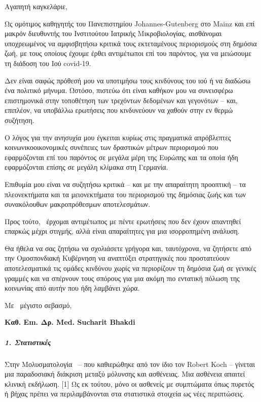 Αγαπητή καγκελάριε,

Ως ομότιμος καθηγητής του Πανεπιστημίου Johannes-Gutenberg στο Mainz και
επί μακρόν διευθυντής του Ινστιτούτου Ιατρικής Μικροβιολογίας,
αισθάνομαι υποχρεωμένος να αμφισβητήσω κριτικά τους εκτεταμένους
περιορισμούς στη δημόσια ζωή, με τους οποίους έχουμε έρθει αντιμέτωποι
επί του παρόντος, για να μειώσουμε τη διάδοση του Ιού covid-19.

Δεν είναι σαφώς πρόθεσή μου να υποτιμήσω τους κινδύνους του ιού ή να
διαδώσω ένα πολιτικό μήνυμα. Ωστόσο, πιστεύω ότι είναι καθήκον μου να
συνεισφέρω επιστημονικά στην τοποθέτηση των τρεχόντων δεδομένων και
γεγονότων -- και, επιπλέον, να υποβάλλω ερωτήσεις που κινδυνεύουν να
χαθούν στην εν θερμώ συζήτηση.

Ο λόγος για την ανησυχία μου έγκειται κυρίως στις πραγματικά απρόβλεπτες
κοινωνικοοικονομικές συνέπειες των δραστικών μέτρων περιορισμού που
εφαρμόζονται επί του παρόντος σε μεγάλα μέρη της Ευρώπης και τα οποία
ήδη εφαρμόζονται επίσης σε μεγάλη κλίμακα στη Γερμανία.

Επιθυμία μου είναι να συζητήσω κριτικά -- και με την απαραίτητη
προοπτική -- τα πλεονεκτήματα και τα μειονεκτήματα του περιορισμού της
δημόσιας ζωής και των συνακόλουθων μακροπρόθεσμων αποτελεσμάτων.

Προς τούτο,~ έρχομαι αντιμέτωπος με πέντε ερωτήσεις που δεν έχουν
απαντηθεί επαρκώς μέχρι στιγμής, αλλά είναι απαραίτητες για μια
ισορροπημένη ανάλυση.

Θα ήθελα να σας ζητήσω να σχολιάσετε γρήγορα και, ταυτόχρονα, να
ζητήσετε από την Ομοσπονδιακή Κυβέρνηση να αναπτύξει στρατηγικές που
προστατεύουν αποτελεσματικά τις ομάδες κινδύνου χωρίς να περιορίζουν τη
δημόσια ζωή σε γενικές γραμμές και να σπέρνουν τους σπόρους για μια
ακόμη πιο εντατική πόλωση της κοινωνίας από αυτήν που ήδη λαμβάνει χώρα.

Με~ μέγιστο σεβασμό,

\textbf{Καθ. Em. Δρ. Med. Sucharit Bhakdi}

\hypertarget{1-ux3c3ux3c4ux3b1ux3c4ux3b9ux3c3ux3c4ux3b9ux3baux3adux3c2}{%
\subparagraph{\texorpdfstring{\textbf{1.
Στατιστικές}}{1. Στατιστικές}}\label{1-ux3c3ux3c4ux3b1ux3c4ux3b9ux3c3ux3c4ux3b9ux3baux3adux3c2}}

Στην Μολυσματολογία~ -- που καθιερώθηκε από τον ίδιο τον Robert Koch --
γίνεται μια παραδοσιακή διάκριση μεταξύ μόλυνσης και ασθένειας. Μια
ασθένεια απαιτεί κλινική εκδήλωση. {[}1{]} Ως εκ τούτου, μόνο οι
ασθενείς με συμπτώματα όπως πυρετός ή βήχας πρέπει να περιλαμβάνονται
στα στατιστικά στοιχεία ως νέες περιπτώσεις.

